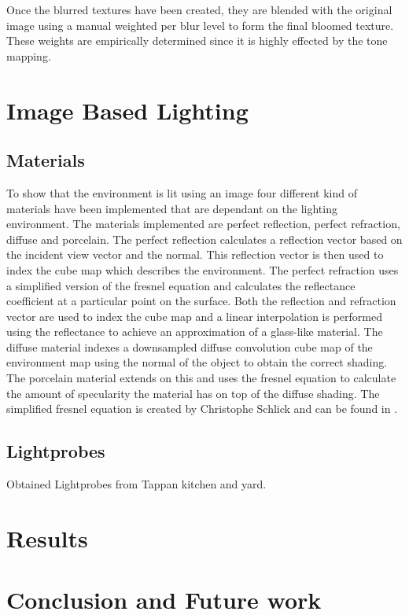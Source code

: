 \documentclass[twocolumn,8pt]{article}
\begin{document}
Once the blurred textures have been created, they are blended with the original image using a manual weighted per blur level to form the final bloomed texture. These weights are empirically determined since it is highly effected by the tone mapping. 

\section{Image Based Lighting}

\subsection{Materials}
To show that the environment is lit using an image four different kind of materials have been implemented that are dependant on the lighting environment. The materials implemented are perfect reflection, perfect refraction, diffuse and porcelain. The perfect reflection calculates a reflection vector based on the incident view vector and the normal. This reflection vector is then used to index the cube map which describes the environment. The perfect refraction uses a simplified version of the fresnel equation and calculates the reflectance coefficient at a particular point on the surface. Both the reflection and refraction vector are used to index the cube map and a linear interpolation is performed using the reflectance to achieve an approximation of a glass-like material. The diffuse material indexes a downsampled diffuse convolution cube map of the environment map using the normal of the object to obtain the correct shading. The porcelain material extends on this and uses the fresnel equation to calculate the amount of specularity the material has on top of the diffuse shading. The simplified fresnel equation is created by Christophe Schlick and can be found in \cite{opengl-orange-book}.

\subsection{Lightprobes}
Obtained Lightprobes from Tappan kitchen and yard.

\section{Results}

\section{Conclusion and Future work}


{}
	
\end{document}
